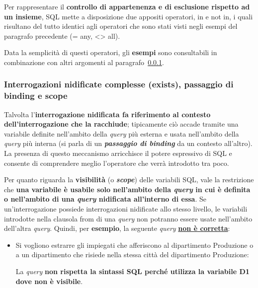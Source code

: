 \documentclass[a4paper]{article}
\begin{document}
	Per rappresentare il \textbf{controllo di appartenenza e di esclusione rispetto ad un insieme}, SQL mette a disposizione due appositi operatori, \textcolor{Red3}{\textsf{in}} e \textcolor{Red3}{\textsf{not in}}, i quali risultano del tutto identici agli operatori che sono stati visti negli esempi del paragrafo precedente (\textsf{= any}, \textsf{<> all}).\newline
	
	\noindent
	Data la semplicità di questi operatori, gli \textcolor{Green4}{\textbf{esempi}} sono consultabili in combinazione con altri argomenti al paragrafo~\ref{interrogazioni nidificate complesse (exists)}.\newpage
	
	\subsubsection{Interrogazioni nidificate complesse (\textsf{exists}), passaggio di binding e scope}\label{interrogazioni nidificate complesse (exists)}
	
	Talvolta l'\textbf{interrogazione nidificata fa riferimento al contesto dell'interrogazione che la racchiude}; tipicamente ciò accade tramite una variabile definite nell'ambito della \emph{query} più esterna e usata nell'ambito della \emph{query} più interna (si parla di un \textbf{\emph{passaggio di binding}} da un contesto all'altro). La presenza di questo meccanismo arricchisce il potere espressivo di SQL e consente di comprendere meglio l'operatore che verrà introdotto tra poco.\newline
	
	\noindent
	Per quanto riguarda la \textbf{visibilità} (o \textbf{\emph{scope}}) delle variabili SQL, vale la restrizione che \textbf{una variabile è usabile solo nell'ambito della \emph{query} in cui è definita o nell'ambito di una \emph{query} nidificata all'interno di essa}. Se un'interrogazione possiede interrogazioni nidificate allo stesso livello, le variabili introdotte nella clausola \textsf{from} di una \emph{query} non potranno essere usate nell'ambito dell'altra \emph{query}. Quindi, per \textcolor{Green4}{\textbf{esempio}}, la seguente \emph{query} \textbf{\underline{non è corretta}}:
	\begin{itemize}
		\item Si vogliono estrarre gli impiegati che afferiscono al dipartimento Produzione o a un dipartimento che risiede nella stessa città del dipartimento Produzione:
		
		La \emph{query} \textbf{non rispetta la sintassi SQL perché utilizza la variabile \textsf{D1} dove non è visibile}.
	\end{itemize}\:\newline
\end{document}
